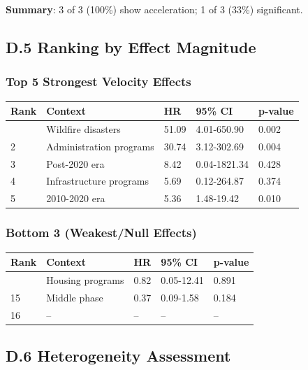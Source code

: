 \documentclass[
  12pt,
  letterpaper,
]{article}
\begin{document}
\textbf{Summary}: 3 of 3 (100\%) show acceleration; 1 of 3 (33\%)
significant.

\subsection{D.5 Ranking by Effect
Magnitude}\label{d.5-ranking-by-effect-magnitude}

\subsubsection{Top 5 Strongest Velocity
Effects}\label{top-5-strongest-velocity-effects}

\begin{longtable}[]{@{}lllll@{}}
\toprule\noalign{}
Rank & Context & HR & 95\% CI & p-value \\
\midrule\noalign{}
\endhead
\bottomrule\noalign{}
\endlastfoot
1 & Wildfire disasters & 51.09 & 4.01-650.90 & 0.002 \\
2 & Administration programs & 30.74 & 3.12-302.69 & 0.004 \\
3 & Post-2020 era & 8.42 & 0.04-1821.34 & 0.428 \\
4 & Infrastructure programs & 5.69 & 0.12-264.87 & 0.374 \\
5 & 2010-2020 era & 5.36 & 1.48-19.42 & 0.010 \\
\end{longtable}

\subsubsection{Bottom 3 (Weakest/Null
Effects)}\label{bottom-3-weakestnull-effects}

\begin{longtable}[]{@{}lllll@{}}
\toprule\noalign{}
Rank & Context & HR & 95\% CI & p-value \\
\midrule\noalign{}
\endhead
\bottomrule\noalign{}
\endlastfoot
14 & Housing programs & 0.82 & 0.05-12.41 & 0.891 \\
15 & Middle phase & 0.37 & 0.09-1.58 & 0.184 \\
16 & -- & -- & -- & -- \\
\end{longtable}

\subsection{D.6 Heterogeneity
Assessment}\label{d.6-heterogeneity-assessment}
\end{document}
